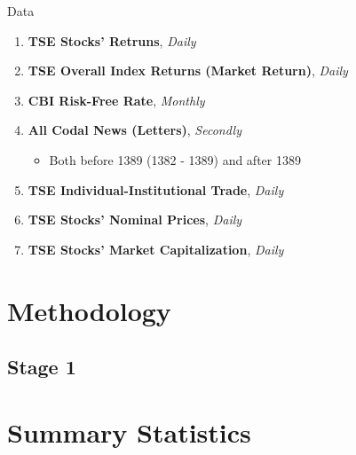 \documentclass{beamer}
\begin{document}
\begin{frame}{Data}

    \begin{enumerate}
        \item \textbf{TSE Stocks' Retruns}, \textit{Daily}
        \item \textbf{TSE Overall Index Returns (Market Return)}, \textit{Daily}
        \item \textbf{CBI Risk-Free Rate}, \textit{Monthly}
        \item \textbf{All Codal News (Letters)}, \textit{Secondly}
              \begin{itemize}
                  \item Both before 1389 (1382 - 1389) and after 1389
              \end{itemize}
        \item \textbf{TSE Individual-Institutional Trade}, \textit{Daily}
        \item \textbf{TSE Stocks' Nominal Prices}, \textit{Daily}
        \item \textbf{TSE Stocks' Market Capitalization}, \textit{Daily}
    \end{enumerate}

\end{frame}



\section{Methodology}

\subsection{Stage 1}


\begin{frame}



\end{frame}


\section{Summary Statistics}
\end{document}
